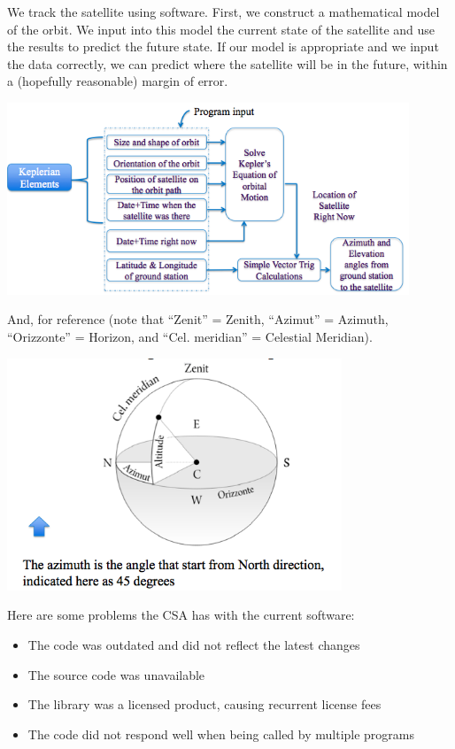 We track the satellite using software. First, we construct a mathematical model of the orbit. We input into this model the current state of the satellite and use the results to predict the future state. If our model is appropriate and we input the data correctly, we can predict where the satellite will be in the future, within a (hopefully reasonable) margin of error.

\begin{center}
	\includegraphics[width=0.9\textwidth]{images/casestudysw.png}
\end{center}

And, for reference (note that ``Zenit'' = Zenith, ``Azimut'' = Azimuth, ``Orizzonte'' = Horizon, and ``Cel. meridian'' = Celestial Meridian).

\begin{center}
	\includegraphics[width=0.75\textwidth]{images/azimuth.png}
\end{center}

Here are some problems the CSA has with the current software:

\begin{itemize}
	\item The code was outdated and did not reflect the latest changes
	\item The source code was unavailable
	\item The library was a licensed product, causing recurrent license fees
	\item The code did not respond well when being called by multiple programs
\end{itemize}


